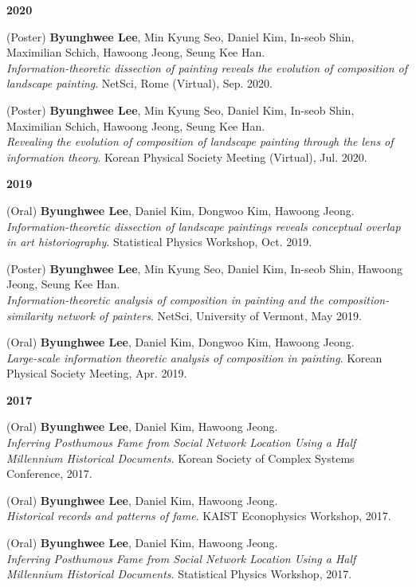 \documentclass[10pt]{article}
\newenvironment{innerlist}[1][\enskip\textbullet]%
{\vspace{0.2\baselineskip}\begin{compactitem}[#1]}{\end{compactitem}\vspace{0.2\baselineskip}}
\begin{document}
\textbf{2020}
\begin{innerlist}
\item (Poster) \textbf{Byunghwee Lee}, Min Kyung Seo, Daniel Kim, In-seob Shin, Maximilian Schich, Hawoong Jeong, Seung Kee Han.\\
\textit{Information-theoretic dissection of painting reveals the evolution of composition of landscape painting}. NetSci, Rome (Virtual), Sep. 2020.

\item (Poster) \textbf{Byunghwee Lee}, Min Kyung Seo, Daniel Kim, In-seob Shin, Maximilian Schich, Hawoong Jeong, Seung Kee Han.\\
\textit{Revealing the evolution of composition of landscape painting through the lens of information theory}. Korean Physical Society Meeting (Virtual), Jul. 2020.
\end{innerlist}

\textbf{2019}
\begin{innerlist}
\item (Oral) \textbf{Byunghwee Lee}, Daniel Kim, Dongwoo Kim, Hawoong Jeong.\\
\textit{Information-theoretic dissection of landscape paintings reveals conceptual overlap in art historiography}. Statistical Physics Workshop, Oct. 2019.

\item (Poster) \textbf{Byunghwee Lee}, Min Kyung Seo, Daniel Kim, In-seob Shin, Hawoong Jeong, Seung Kee Han.\\
\textit{Information-theoretic analysis of composition in painting and the composition-similarity network of painters}. NetSci, University of Vermont, May 2019.

\item (Oral) \textbf{Byunghwee Lee}, Daniel Kim, Dongwoo Kim, Hawoong Jeong.\\
\textit{Large-scale information theoretic analysis of composition in painting}. Korean Physical Society Meeting, Apr. 2019.
\end{innerlist}

\textbf{2017}
\begin{innerlist}
\item (Oral) \textbf{Byunghwee Lee}, Daniel Kim, Hawoong Jeong.\\
\textit{Inferring Posthumous Fame from Social Network Location Using a Half Millennium Historical Documents}. Korean Society of Complex Systems Conference, 2017.

\item (Oral) \textbf{Byunghwee Lee}, Daniel Kim, Hawoong Jeong.\\
\textit{Historical records and patterns of fame}. KAIST Econophysics Workshop, 2017.

\item (Oral) \textbf{Byunghwee Lee}, Daniel Kim, Hawoong Jeong.\\
\textit{Inferring Posthumous Fame from Social Network Location Using a Half Millennium Historical Documents}. Statistical Physics Workshop, 2017.
\end{innerlist}
\end{document}
